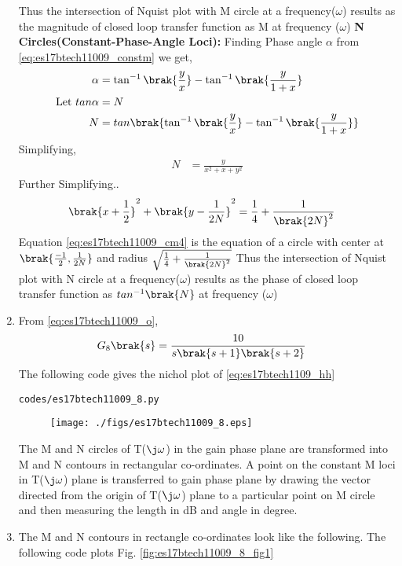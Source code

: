 \begin{enumerate}[label=\thesection.\arabic*.,ref=\thesection.\theenumi]
Thus the intersection of Nquist plot with M circle at a frequency($\omega$) results as the magnitude of closed loop transfer function as M at frequency ($\omega$)
\textbf{N Circles(Constant-Phase-Angle Loci):}
Finding Phase angle $\alpha$ from \eqref{eq:es17btech11009_constm} we get,
\begin{align}
\alpha &= \tan^{-1}\brak{\frac{y}{x}}-\tan^{-1}\brak{\frac{y}{1+x}}
\\
\text{Let } tan\alpha &= N
\\
N &= tan\brak{\tan^{-1}\brak{\frac{y}{x}}-\tan^{-1}\brak{\frac{y}{1+x}}}
\end{align}
Simplifying,
\begin{align}
N &= \frac{y}{x^{2}+x+y^{2}}
\end{align}
Further Simplifying..
\begin{align}
\brak{x+\frac{1}{2}}^{2}+\brak{y-\frac{1}{2N}}^{2} &= \frac{1}{4}+\frac{1}{\brak{2N}^{2}}
\label{eq:es17btech11009_cm4}
\end{align}
Equation \eqref{eq:es17btech11009_cm4} is the equation of a circle with center at $\brak{\frac{-1}{2},\frac{1}{2N}}$ and radius $\sqrt{\frac{1}{4}+\frac{1}{\brak{2N}^{2}}}$
Thus the intersection of Nquist plot with N circle at a frequency($\omega$) results as the phase of closed loop transfer function as $tan^{-1}\brak{N}$ at frequency ($\omega$)
\item
From \eqref{eq:es17btech11009_o},
\begin{align}
G_8\brak{s} &=\frac{10}{s\brak{s+1}\brak{s+2}}
\label{eq:es17btech1109_hh}
\end{align}
\solution 
The following code gives the nichol plot of \eqref{eq:es17btech1109_hh} 
\begin{lstlisting}
codes/es17btech11009_8.py
\end{lstlisting}
\begin{figure}[!h]
\texttt{[image: ./figs/es17btech11009\_8.eps]}
\caption{}
\label{fig:es17btech11009_8}
\end{figure}
The M and N circles of T($\j\omega$) in the gain phase plane are transformed into M and N contours in rectangular co-ordinates. A point on the constant M loci in T($\j\omega$) plane is transferred to gain phase plane by drawing the vector directed from the origin of T($\j\omega$) plane to a particular point on M circle and then measuring the length in dB and angle in degree.
\item
The M and N contours in rectangle co-ordinates look like the following.
The following code plots Fig. \ref{fig:es17btech11009_8_fig1}

\end{enumerate}
